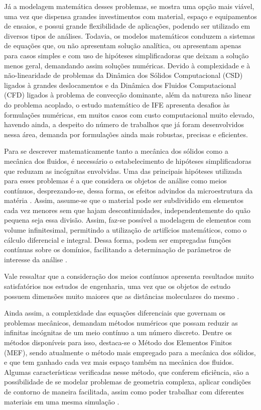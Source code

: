 Já a modelagem matemática desses problemas, se mostra uma opção mais viável, uma vez que dispensa grandes investimentos com material, espaço e equipamentos de ensaios, e possui grande flexibilidade de aplicações, podendo ser utilizado em diversos tipos de análises. Todavia, os modelos matemáticos conduzem a sistemas de equações que, ou não apresentam solução analítica, ou apresentam apenas para casos simples e com uso de hipóteses simplificadoras que deixam a solução menos geral, demandando assim soluções numéricas. Devido à complexidade e à não-linearidade de problemas da Dinâmica dos Sólidos Computacional (CSD) ligados à grandes deslocamentos e da Dinâmica dos Fluidos Computacional (CFD) ligados à problema de convecção dominante, além da natureza não linear do problema acoplado, o estudo matemático de IFE apresenta desafios às formulações numéricas, em muitos casos com custo computacional muito elevado, havendo ainda, a despeito do número de trabalhos que já foram desenvolvidos nessa área, demanda por formulações ainda mais robustas, precisas e eficientes.

Para se descrever matematicamente tanto a mecânica dos sólidos como a mecânica dos fluidos, é necessário o estabelecimento de hipóteses simplificadoras que reduzam as incógnitas envolvidas. Uma das principais hipóteses utilizada para esses problemas é a que considera os objetos de análise como meios contínuos, desprezando-se, dessa forma, os efeitos advindos da microestrutura da matéria \cite{lai2009introduction, mase2009continuum}. Assim, assume-se que o material pode ser subdividido em elementos cada vez menores sem que hajam descontinuidades, independentemente do quão pequena seja essa divisão. Assim, faz-se possível a modelagem de elementos com volume infinitesimal, permitindo a utilização de artifícios matemáticos, como o cálculo diferencial e integral. Dessa forma, podem ser empregadas funções contínuas sobre os domínios, facilitando a determinação de parâmetros de interesse da análise \cite{irgens2008continuum, lai2009introduction, malvern1969introduction}.

Vale ressaltar que a consideração dos meios contínuos apresenta resultados muito satisfatórios nos estudos de engenharia, uma vez que os objetos de estudo possuem dimensões muito maiores que as distâncias moleculares do mesmo \cite{malvern1969introduction, mase2009continuum}.

Ainda assim, a complexidade das equações diferenciais que governam os problemas mecânicos, demandam métodos numéricos que possam reduzir as infinitas incógnitas de um meio contínuo a um número discreto. Dentre os métodos disponíveis para isso, destaca-se o Método dos Elementos Finitos (MEF), sendo atualmente o método mais empregado para a mecânica dos sólidos, e que tem ganhado cada vez mais espaço também na mecânica dos fluidos. Algumas características verificadas nesse método, que conferem eficiência, são a possibilidade de se modelar problemas de geometria complexa, aplicar condições de contorno de maneira facilitada, assim como poder trabalhar com diferentes materiais em uma mesma simulação \cite{anderson1995computational}.


